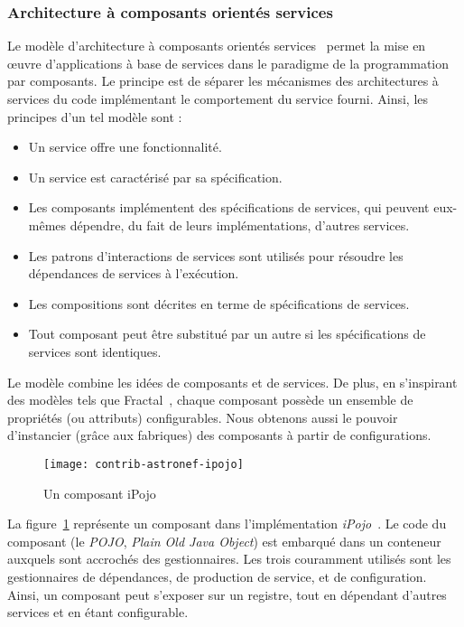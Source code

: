 \subsubsection{Architecture à composants orientés services}
Le modèle d'architecture à composants orientés services~\cite{Cervantes:servicecomponent} permet la mise en œuvre d'applications à base de services dans le paradigme de la programmation par composants. Le principe est de séparer les mécanismes des architectures à services du code implémentant le comportement du service fourni. Ainsi, les principes d'un tel modèle sont :
\begin{itemize}
    \item Un service offre une fonctionnalité.
    \item Un service est caractérisé par sa spécification.
    \item Les composants implémentent des spécifications de services, qui peuvent eux-mêmes dépendre, du fait de leurs implémentations, d'autres services.
    \item Les patrons d'interactions de services sont utilisés pour résoudre les dépendances de services à l'exécution.
    \item Les compositions sont décrites en terme de spécifications de services.
    \item Tout composant peut être substitué par un autre si les spécifications de services sont identiques.
\end{itemize}
Le modèle combine les idées de composants et de services. De plus, en s'inspirant des modèles tels que Fractal~\cite{Bruneton:fractal}, chaque composant possède un ensemble de propriétés (ou attributs) configurables. Nous obtenons aussi le pouvoir d'instancier (grâce aux fabriques) des composants à partir de configurations.

\begin{figure}[ht]
    \centering
    \texttt{[image: contrib-astronef-ipojo]}
    \caption{Un composant iPojo}\label{fig:contrib:astronef:ipojo}
\end{figure}
La figure~\ref{fig:contrib:astronef:ipojo} représente un composant dans l'implémentation \textit{iPojo}~\cite{Escoffier:ipojo}. Le code du composant (le \textit{POJO}, \textit{Plain Old Java Object}) est embarqué dans un conteneur auxquels sont accrochés des gestionnaires. Les trois couramment utilisés sont les gestionnaires de dépendances, de production de service, et de configuration. Ainsi, un composant peut s'exposer sur un registre, tout en dépendant d'autres services et en étant configurable.

